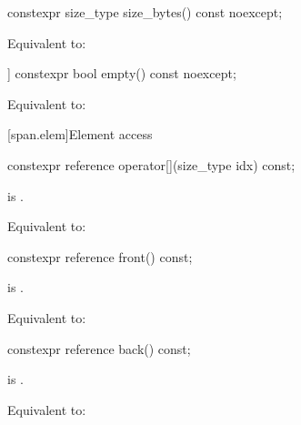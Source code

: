 %
\begin{itemdecl}
constexpr size_type size_bytes() const noexcept;
\end{itemdecl}

\begin{itemdescr}
\pnum
\effects
Equivalent to: 
\end{itemdescr}

%
\begin{itemdecl}
[[nodiscard]] constexpr bool empty() const noexcept;
\end{itemdecl}

\begin{itemdescr}
\pnum
\effects
Equivalent to: 
\end{itemdescr}

[span.elem]{Element access}

%
\begin{itemdecl}
constexpr reference operator[](size_type idx) const;
\end{itemdecl}

\begin{itemdescr}
\pnum
\expects
{} is .

\pnum
\effects
Equivalent to: 
\end{itemdescr}

%
\begin{itemdecl}
constexpr reference front() const;
\end{itemdecl}

\begin{itemdescr}
\pnum
\expects
{} is .

\pnum
\effects
Equivalent to: 
\end{itemdescr}

%
\begin{itemdecl}
constexpr reference back() const;
\end{itemdecl}

\begin{itemdescr}
\pnum
\expects
{} is .

\pnum
\effects
Equivalent to: 
\end{itemdescr}

